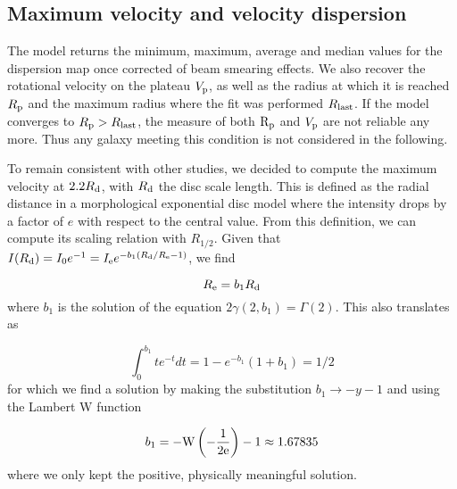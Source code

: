 \subsection{Maximum velocity and velocity dispersion}

The model returns the minimum, maximum, average and median values for the dispersion map once corrected of beam smearing effects. We also recover the rotational velocity on the plateau $V_{\rm{p}}$, as well as the radius at which it is reached $R_{\rm{p}}$ and the maximum radius where the fit was performed $R_{\rm{last}}$. If the model converges to $R_{\rm{p}} > R_{\rm{last}}$, the measure of both $\rm{R_p}$ and $V_{\rm{p}}$ are not reliable any more. Thus any galaxy meeting this condition is not considered in the following.

To remain consistent with other studies, we decided to compute the maximum velocity at $2.2 R_{\rm{d}}$, with $R_{\rm{d}}$ the disc scale length. This is defined as the radial distance in a morphological exponential disc model where the intensity drops by a factor of $e$ with respect to the central value. From this definition, we can compute its scaling relation with $R_{1/2}$. Given that $I(R_{\rm{d}}) = I_0 e^{-1} = I_{\rm{e}} e^{- b_1 ( R_{\rm{d}} / R_{\rm{e}} - 1 )}$, we find

\begin{equation}
	R_{\rm{e}} = b_1 R_{\rm{d}}
\end{equation}
where $b_1$ is the solution of the equation $2 \gamma (2, b_1) = \Gamma(2)$. This also translates as

\begin{equation}
	\int_0^{b_1} t e^{-t} dt = 1 - e^{-b_1} ( 1 + b_1) = 1/2
\end{equation}
for which we find a solution by making the substitution $b_1 \rightarrow - y - 1$ and using the Lambert W function

\begin{equation}
	b_1 = - \rm{W} \left ( - \frac{1}{2 e} \right ) - 1 \approx 1.67835
\end{equation}
where we only kept the positive, physically meaningful solution. 
